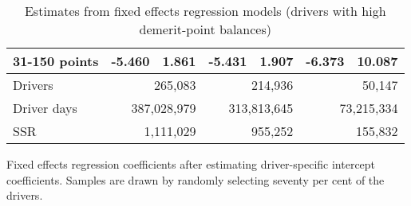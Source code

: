 \begin{table}
\begin{tabular}{l r r r r r r}
31-150 points  & -5.460  &  1.861  & -5.431  &  1.907  & -6.373  & 10.087   \\ 
 

\hline 
 

Drivers 
 & \multicolumn{2}{r}{265,083}  & \multicolumn{2}{r}{214,936}  & \multicolumn{2}{r}{50,147}   \\ 
 

Driver days 
 & \multicolumn{2}{r}{387,028,979}  & \multicolumn{2}{r}{313,813,645}  & \multicolumn{2}{r}{73,215,334}   \\ 
 

SSR 
 & \multicolumn{2}{r}{1,111,029}  & \multicolumn{2}{r}{955,252}  & \multicolumn{2}{r}{155,832}   \\ 
 

\hline 
 
\end{tabular} 
\caption{Estimates from fixed effects regression models (drivers with high demerit-point balances)} 
Fixed effects regression coefficients after estimating driver-specific intercept coefficients. 
Samples are drawn by randomly selecting seventy per cent of the drivers. 
\label{tab:FE_regs_high_pts} 
\end{table} 
 

